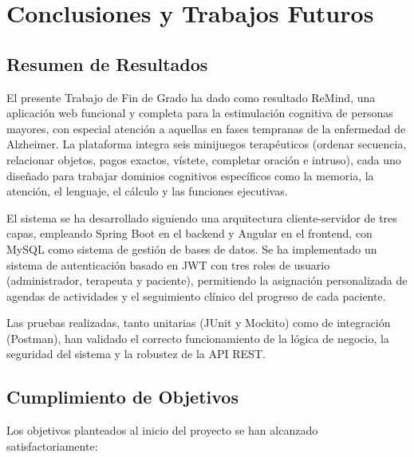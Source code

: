 \chapter{Conclusiones y Trabajos Futuros}

\section{Resumen de Resultados}

El presente Trabajo de Fin de Grado ha dado como resultado ReMind, una aplicación web funcional y completa para la estimulación cognitiva de personas mayores, con especial atención a aquellas en fases tempranas de la enfermedad de Alzheimer. La plataforma integra seis minijuegos terapéuticos (ordenar secuencia, relacionar objetos, pagos exactos, vístete, completar oración e intruso), cada uno diseñado para trabajar dominios cognitivos específicos como la memoria, la atención, el lenguaje, el cálculo y las funciones ejecutivas.

El sistema se ha desarrollado siguiendo una arquitectura cliente-servidor de tres capas, empleando Spring Boot en el backend y Angular en el frontend, con MySQL como sistema de gestión de bases de datos. Se ha implementado un sistema de autenticación basado en JWT con tres roles de usuario (administrador, terapeuta y paciente), permitiendo la asignación personalizada de agendas de actividades y el seguimiento clínico del progreso de cada paciente.

Las pruebas realizadas, tanto unitarias (JUnit y Mockito) como de integración (Postman), han validado el correcto funcionamiento de la lógica de negocio, la seguridad del sistema y la robustez de la API REST.

\section{Cumplimiento de Objetivos}

Los objetivos planteados al inicio del proyecto se han alcanzado satisfactoriamente:

